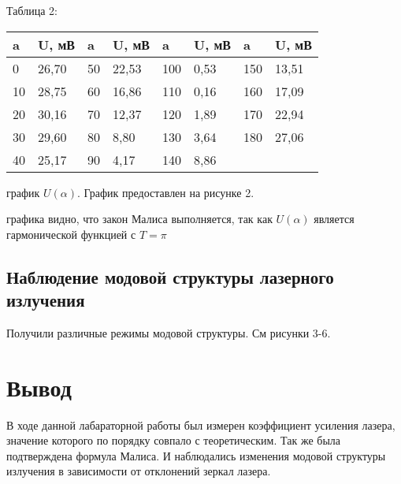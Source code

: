 \begin{table}[h!]
    \begin{center}
    Таблица 2: \\
    \begin{tabular}{|l|l|l|l|l|l|l|l|}
    \hline
    a  & U, мВ & a  & U, мВ & a   & U, мВ & a   & U, мВ \\ \hline
    0  & 26,70 & 50 & 22,53 & 100 & 0,53  & 150 & 13,51 \\ \hline
    10 & 28,75 & 60 & 16,86 & 110 & 0,16  & 160 & 17,09 \\ \hline
    20 & 30,16 & 70 & 12,37 & 120 & 1,89  & 170 & 22,94 \\ \hline
    30 & 29,60 & 80 & 8,80  & 130 & 3,64  & 180 & 27,06 \\ \hline
    40 & 25,17 & 90 & 4,17  & 140 & 8,86  &     &       \\ \hline
    \end{tabular}
    \end{center}
\end{table}

\newpage

 график $ U(\alpha) $. График предоставлен на рисунке 2.


 графика видно, что закон Малиса выполняется, так как $ U(\alpha) $ является
гармонической функцией с $ T = \pi $

\subsection{Наблюдение модовой структуры лазерного излучения}

Получили различные режимы модовой структуры. См рисунки 3-6.



\newpage

\section{Вывод}

В ходе данной лабараторной работы был измерен коэффициент усиления лазера, значение
которого по порядку совпало с теоретическим. Так же была подтверждена формула Малиса.
И наблюдались изменения модовой структуры излучения в зависимости от отклонений зеркал
лазера.